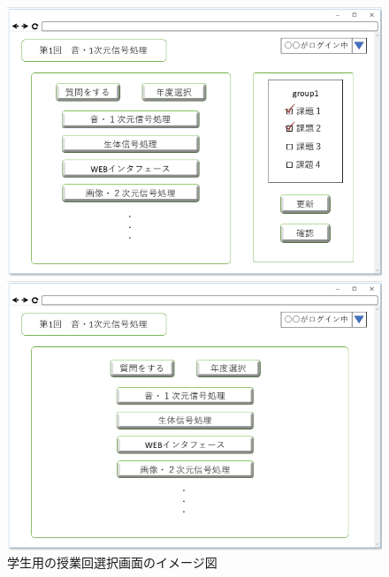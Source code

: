 \begin{figure}[htbp]
 \begin{minipage}{0.5\hsize}
  \begin{center}
   \includegraphics[width=1\linewidth,clip]{./img/32.png}
  \end{center}

 \end{minipage}
 \begin{minipage}{0.5\hsize}
  \begin{center}
   \includegraphics[width=1\linewidth,clip]{./img/33.png}
  \end{center}
 \end{minipage}
 \caption{学生用の授業回選択画面のイメージ図}\label{fig:32}
\end{figure}

